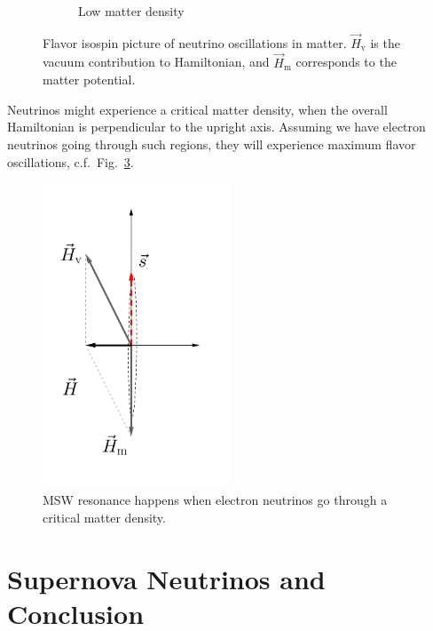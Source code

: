 \begin{figure}[htbp]
\begin{subfigure}[t]{0.3\textwidth}
		\caption{Low matter density}\label{chap:basics-sec:flavor-isospin-pic-fig:msw-adiabatic-small-density}
	\end{subfigure}
	\caption{Flavor isospin picture of neutrino oscillations in matter. $\vec H_{\mathrm v}$ is the vacuum contribution to Hamiltonian, and $\vec H_{\mathrm m}$ corresponds to the matter potential.}\label{chap:basics-sec:flavor-isospin-pic-fig:msw-adiabatic}
\end{figure}

Neutrinos might experience a critical matter density, when the overall Hamiltonian is perpendicular to the upright axis. Assuming we have electron neutrinos going through such regions, they will experience maximum flavor oscillations, c.f.~Fig.~\ref{chap:basics-sec:flavor-isospin-pic-fig:msw-adiabatic-critical}.

\begin{figure}
    \centering
    \includegraphics[width=0.5\textwidth]{chapters/assets/basics/matter-effect-critical-density}
    \caption{MSW resonance happens when electron neutrinos go through a critical matter density.}
    \label{chap:basics-sec:flavor-isospin-pic-fig:msw-adiabatic-critical}
\end{figure}




\section{Supernova Neutrinos and Conclusion}


